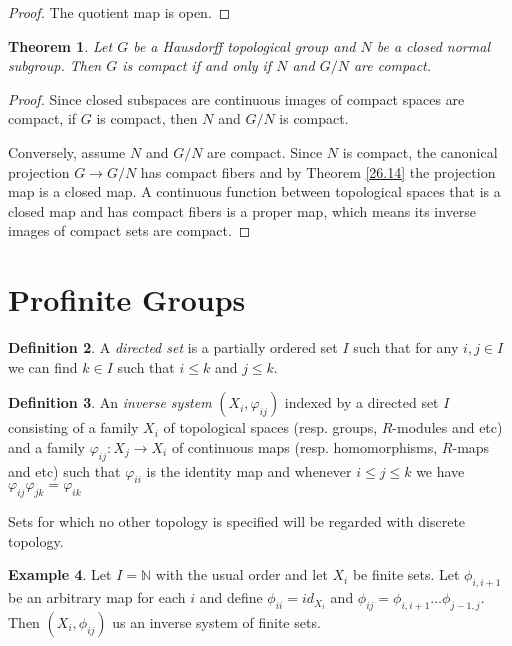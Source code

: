 \documentclass[12pt]{report}
\newtheorem{theorem}{Theorem}[section]
\theoremstyle{definition}
\newtheorem{definition}[theorem]{Definition}
\newtheorem{example}[theorem]{Example}
\newcommand{\NN}{\mathbb{N}}
\begin{document}
\begin{proof}
	The quotient map is open.
\end{proof}

\begin{theorem}
	Let $G$ be a Hausdorff topological group and $N$ be a closed normal subgroup. Then $G$ is compact if and only if $N$ and $G/N$ are compact.
\end{theorem}

\begin{proof}
	Since closed subspaces are continuous images of compact spaces are compact, if $G$ is compact, then $N$ and $G/N$ is compact.

	Conversely, assume $N$ and $G/N$ are compact. Since $N$ is compact, the canonical projection $G\to G/N$ has compact fibers and by Theorem \ref{26.14} the projection map is a closed map. A continuous function between topological spaces that is a closed map and has compact fibers is a proper map, which means its inverse images of compact sets are compact.
\end{proof}

\section{Profinite Groups}

\begin{definition}
	A \emph{directed set} is a partially ordered set $I$ such that for any $i,j\in I$ we can find $k\in I$ such that $i\leq k$ and $j\leq k$.
\end{definition}

\begin{definition}
	An \emph{inverse system} $(X_i, \varphi_{ij})$ indexed by a directed set $I$ consisting of a family $X_i$ of topological spaces (resp. groups, $R$-modules and etc) and a family $\varphi_{ij}: X_j\to X_i$ of continuous maps (resp. homomorphisms, $R$-maps and etc) such that $\varphi_{ii}$ is the identity map and whenever $i\leq j\leq k$ we have $\varphi_{ij}\varphi_{jk}=\varphi_{ik}$
\end{definition}

Sets for which no other topology is specified will be regarded with discrete topology.

\begin{example}
	Let $I=\NN$ with the usual order and let $X_i$ be finite sets. Let $\phi_{i,i+1}$ be an arbitrary map for each $i$ and define $\phi_{ii}=id_{X_i}$ and $\phi_{ij}=\phi_{i,i+1}\dots\phi_{j-1,j}$. Then $(X_i,\phi_{ij})$ us an inverse system of finite sets.
\end{example}
\end{document}
